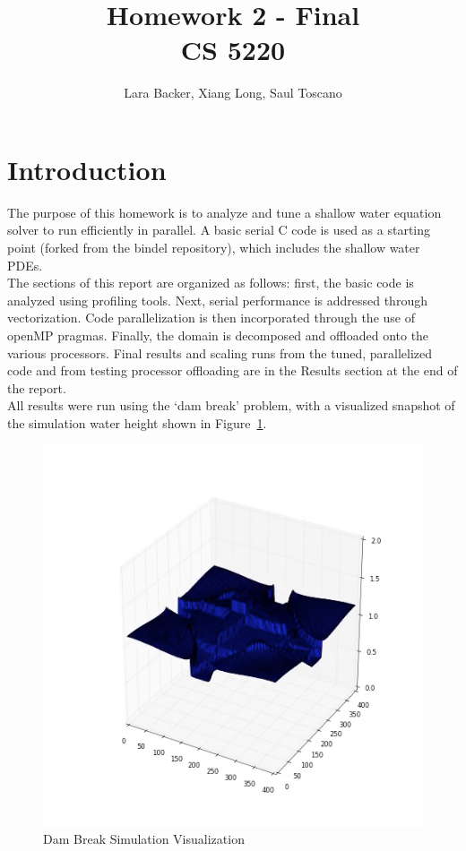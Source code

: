 \documentclass{article}
\begin{document}
\title{Homework 2 - Final \\CS 5220}
\author{Lara Backer, Xiang Long, Saul Toscano}

\maketitle

\section{Introduction}

The purpose of this homework is to analyze and tune a shallow water equation solver to run efficiently in parallel. A basic serial C code is used as a starting point (forked from the bindel repository), which includes the shallow water PDEs. \\ 

The sections of this report are organized as follows: first, the basic code is analyzed using profiling tools. Next, serial performance is addressed through vectorization. Code parallelization is then incorporated through the use of openMP pragmas. Finally, the domain is decomposed and offloaded onto the various processors. Final results and scaling runs from the tuned, parallelized code and from testing processor offloading are in the Results section at the end of the report. \\ 

All results were run using the `dam break'  problem, with a visualized snapshot of the simulation water height shown in Figure~\ref{waterheight}.

\begin{figure}[here]
 \centering
 \includegraphics[width=0.6\linewidth]{shallow_wave_screenshot.png}
 \caption{Dam Break Simulation Visualization}
 \label{waterheight}
\end{figure}
\end{document}

